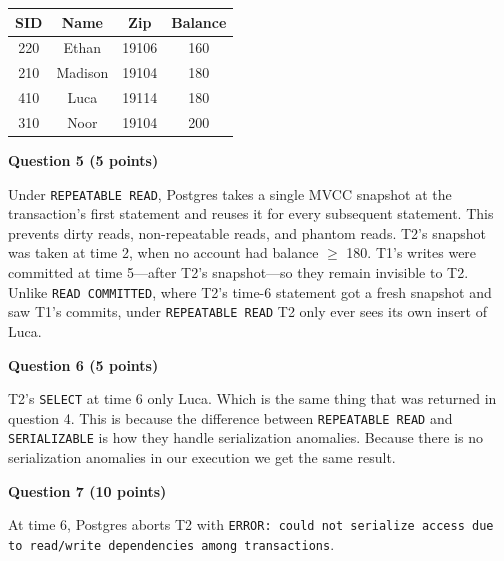 \documentclass[12pt,letterpaper, onecolumn]{exam}
\begin{document}
\begin{questions}
\begin{solution}
    \begin{center}
    \begin{tabular}{|c|c|c|c|}
    \hline
    \textbf{SID} & \textbf{Name} & \textbf{Zip} & \textbf{Balance} \\
    \hline
    220 & Ethan   & 19106 & 160 \\
    210 & Madison & 19104 & 180 \\
    410 & Luca    & 19114 & 180 \\
    310 & Noor    & 19104 & 200 \\
    \hline
    \end{tabular}
    \end{center}
  \end{solution}
  \pagebreak
  \question \textbf{Question 5 (5 points)}
  \begin{solution}
    Under \texttt{REPEATABLE READ}, Postgres takes a single MVCC snapshot at the transaction's first statement and reuses it for every subsequent statement. This prevents dirty reads, non-repeatable reads, and phantom reads.
    T2's snapshot was taken at time 2, when no account had balance $\geq$ 180. T1's writes were committed at time 5---after T2's snapshot---so they remain invisible to T2. Unlike \texttt{READ COMMITTED}, where T2's time-6 statement got a fresh snapshot and saw T1's commits, under \texttt{REPEATABLE READ} T2 only ever sees its own insert of Luca.
  \end{solution}
  \question \textbf{Question 6 (5 points)}
  \begin{solution}
    T2's \texttt{SELECT} at time 6 only Luca. Which is the same thing that was returned in question 4. This is because the difference between \texttt{REPEATABLE READ} and \texttt{SERIALIZABLE} is how they handle serialization anomalies. Because there is
    no serialization anomalies in our execution we get the same result.
  \end{solution}
  \question \textbf{Question 7 (10 points)}
  \begin{solution}
   At time 6, Postgres aborts T2 with \texttt{ERROR: could not serialize access due to read/write dependencies among transactions}.

\end{solution}
\end{questions}
\end{document}
